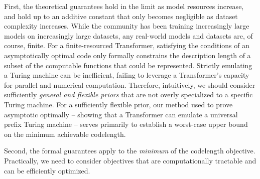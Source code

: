 First, the theoretical guarantees  hold in the limit as model resources increase, and hold up to an additive constant that only becomes negligible as dataset complexity increases. While the community has been training increasingly large models on increasingly large datasets, any real-world models and datasets are, of course, finite. For a finite-resourced Transformer, satisfying the conditions of an asymptotically optimal code only formally constrains the description length of a subset of the computable functions that could be represented. Strictly emulating a Turing machine can be inefficient, failing to leverage a Transformer's capacity for parallel and numerical computation. Therefore, intuitively, we should consider sufficiently \emph{general and flexible priors} that are not overly specialized to a specific Turing machine. For a sufficiently flexible prior, our method used to prove asymptotic optimally -- showing that a Transformer can emulate a universal prefix Turing machine -- serves primarily to establish a worst-case upper bound on the minimum achievable codelength. 

Second, the formal guarantees apply to the \emph{minimum} of the codelength objective. Practically, we need to consider objectives that are computationally tractable and can be efficiently optimized.



